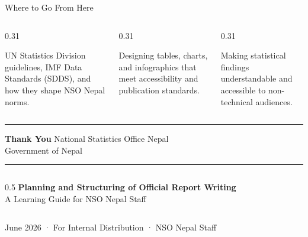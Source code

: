 \documentclass[xcolor={table,dvipsnames},aspectratio=169,11pt]{beamer}
\begin{document}
\begin{frame}{Where to Go From Here}
    \begin{columns}[t]
        \begin{column}{0.31\textwidth}
            \begin{tcolorbox}[colback=nsoLight, colframe=nsoBlue, title=1. International Standards, coltitle=white, boxrule=1pt, height=3.8cm]
                \scriptsize UN Statistics Division guidelines, IMF Data Standards (SDDS), and how they shape NSO Nepal norms.
            \end{tcolorbox}
        \end{column}
        \begin{column}{0.31\textwidth}
            \begin{tcolorbox}[colback=nsoLight, colframe=nsoBlue, title=2. Data Visualisation, coltitle=white, boxrule=1pt, height=3.8cm]
                \scriptsize Designing tables, charts, and infographics that meet accessibility and publication standards.
            \end{tcolorbox}
        \end{column}
        \begin{column}{0.31\textwidth}
            \begin{tcolorbox}[colback=nsoLight, colframe=nsoBlue, title=3. Plain Language, coltitle=white, boxrule=1pt, height=3.8cm]
                \scriptsize Making statistical findings understandable and accessible to non-technical audiences.
            \end{tcolorbox}
        \end{column}
    \end{columns}
\end{frame}

{
\begin{frame}[plain]
    \vspace{1.5cm}
    \textcolor{nsoGold}{\rule{3cm}{4pt}}
    \vskip 0.4cm
    {\color{white}\huge\bfseries Thank You}
    \vskip 0.2cm
    {\color{nsoLight}\Large National Statistics Office Nepal} \\
    {\color{nsoMid}\large Government of Nepal}
    \vskip 0.4cm
    \textcolor{nsoGold}{\rule{3cm}{4pt}}
    \vskip 0.4cm
    \begin{columns}[t]
    \begin{column}{0.5\textwidth}
        {\color{white}\scriptsize\bfseries Planning and Structuring of Official Report Writing} \\[2pt]
        {\color{nsoLight}\tiny A Learning Guide for NSO Nepal Staff}
    \end{column}
    \end{columns}
    \vskip 0.8cm
    {\color{nsoMid}\tiny June 2026 · For Internal Distribution · NSO Nepal Staff}
\end{frame}
}
\end{document}
